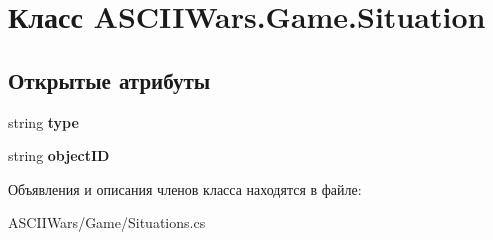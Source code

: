 \hypertarget{class_a_s_c_i_i_wars_1_1_game_1_1_situation}{}\section{Класс A\+S\+C\+I\+I\+Wars.\+Game.\+Situation}
\label{class_a_s_c_i_i_wars_1_1_game_1_1_situation}
\subsection*{Открытые атрибуты}
\begin{DoxyCompactItemize}
\item 
\hypertarget{class_a_s_c_i_i_wars_1_1_game_1_1_situation_aefc60f917d443f47bdec48d9c45af5df}{}\label{class_a_s_c_i_i_wars_1_1_game_1_1_situation_aefc60f917d443f47bdec48d9c45af5df} 
string {\bfseries type}
\item 
\hypertarget{class_a_s_c_i_i_wars_1_1_game_1_1_situation_a84a39566fb7d8b3efa59e990597ac039}{}\label{class_a_s_c_i_i_wars_1_1_game_1_1_situation_a84a39566fb7d8b3efa59e990597ac039} 
string {\bfseries object\+ID}
\end{DoxyCompactItemize}


Объявления и описания членов класса находятся в файле\+:\begin{DoxyCompactItemize}
\item 
A\+S\+C\+I\+I\+Wars/\+Game/Situations.\+cs\end{DoxyCompactItemize}
